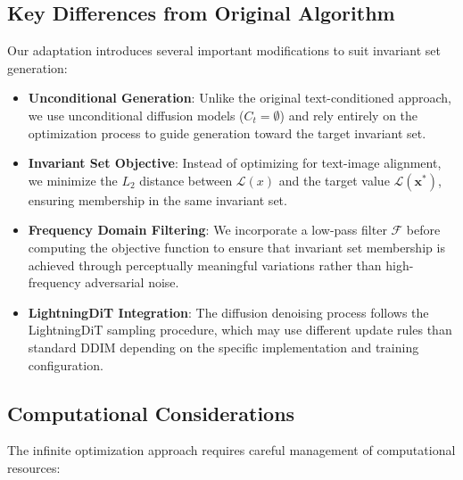 \documentclass[licencjacka,en]{pracamgr}
\begin{document}
\subsection{Key Differences from Original Algorithm}

Our adaptation introduces several important modifications to suit invariant set generation:

\begin{itemize}
    \item \textbf{Unconditional Generation}: Unlike the original text-conditioned approach, we use unconditional diffusion models ($C_t = \emptyset$) and rely entirely on the optimization process to guide generation toward the target invariant set.
    
    \item \textbf{Invariant Set Objective}: Instead of optimizing for text-image alignment, we minimize the $L_2$ distance between $\mathcal{L}(x)$ and the target value $\mathcal{L}(\mathbf{x^*})$, ensuring membership in the same invariant set.
    
    \item \textbf{Frequency Domain Filtering}: We incorporate a low-pass filter $\mathcal{F}$ before computing the objective function to ensure that invariant set membership is achieved through perceptually meaningful variations rather than high-frequency adversarial noise.
    
    \item \textbf{LightningDiT Integration}: The diffusion denoising process follows the LightningDiT sampling procedure, which may use different update rules than standard DDIM depending on the specific implementation and training configuration.
\end{itemize}

\subsection{Computational Considerations}

The infinite optimization approach requires careful management of computational resources:
\end{document}

